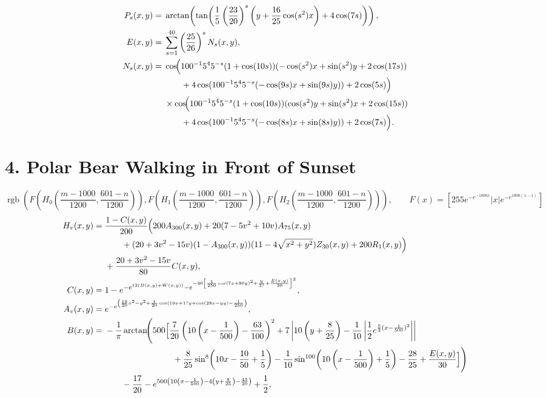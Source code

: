 \documentclass[10pt]{article}
\newcommand{\Fn}{F(x)=\left[255e^{-e^{-1000x}}|x|e^{-e^{1000(x-1)}}\right]}
\begin{document}
\begin{landscape}
\begin{align*}
P_s(x,y)={}&
\arctan\!\left(
\tan\!\left(\frac15\left(\frac{23}{20}\right)^s\left(y+\frac{16}{25}\cos(s^2)x\right)+4\cos(7s)\right)
\right),
\\
E(x,y)={}&\sum_{s=1}^{40}\left(\frac{25}{26}\right)^sN_s(x,y),
\\
N_s(x,y)={}&
\cos\!\Bigl(100^{-1}5^45^{-s}(1+\cos(10s))(-\cos(s^2)x+\sin(s^2)y+2\cos(17s))
\\
&\qquad +4\cos(100^{-1}5^45^{-s}(-\cos(9s)x+\sin(9s)y))+2\cos(5s)\Bigr)
\\
&\times
\cos\!\Bigl(100^{-1}5^45^{-s}(1+\cos(10s))(\cos(s^2)y+\sin(s^2)x+2\cos(15s))
\\
&\qquad +4\cos(100^{-1}5^45^{-s}(-\cos(8s)x+\sin(8s)y))+2\cos(7s)\Bigr).
\end{align*}

\section*{4. Polar Bear Walking in Front of Sunset}
\[
\operatorname{rgb}\!\left(
F\!\left(H_0\!\left(\frac{m-1000}{1200},\frac{601-n}{1200}\right)\right),
F\!\left(H_1\!\left(\frac{m-1000}{1200},\frac{601-n}{1200}\right)\right),
F\!\left(H_2\!\left(\frac{m-1000}{1200},\frac{601-n}{1200}\right)\right)
\right),\qquad \Fn
\]
\begin{align*}
H_v(x,y)={}&\frac{1-C(x,y)}{200}
\Bigl(
200A_{300}(x,y)+20(7-5v^2+10v)A_{75}(x,y)
\\
&\qquad +(20+3v^2-15v)(1-A_{300}(x,y))(11-4\sqrt{x^2+y^2})Z_{30}(x,y)
+200R_{1}(x,y)
\Bigr)
\\
&+\frac{20+3v^2-15v}{80}C(x,y),
\\
C(x,y)={}&1-e^{-e^{12(B(x,y)+W(x,y))}
-e^{-40\left[\frac1{250}\cos(7x+80y)^2+\frac y{3?}+\frac{E(x,y)}{30}\right]^2}},
\\
A_v(x,y)={}&
e^{-e^{\left(\frac{19}{20}x^2-y^2+\frac1{20}\cos(19x+1?y+\cos(28x-yy)-\frac1{250}\right)}},
\\
B(x,y)={}&
-\frac1\pi\arctan\!\Biggl(
500\Bigl[
\frac7{20}\left(10\left(x-\frac1{500}\right)-\frac{63}{100}\right)^2
+7\left|10\left(y+\frac8{25}\right)-\frac1{10}\left|\frac1{2}e^{\frac52(x-\frac1{500})^2}\right|\right|
\\
&\qquad\qquad\qquad\qquad
+\frac8{25}\sin^8\!\left(10x-\frac{10}{50}+\frac15\right)
-\frac1{10}\sin^{100}\!\left(10\left(x-\frac1{500}\right)+\frac15\right)
-\frac{28}{25}
+\frac{E(x,y)}{30}
\Bigr]\Biggr)
\\
&\qquad-\frac{17}{20}
-e^{500\left(10\left(x-\frac1{500}\right)-4\left(y+\frac8{25}\right)-\frac{43}{20}\right)}+\frac12,

\end{align*}
\end{landscape}
\end{document}

